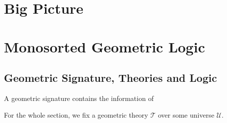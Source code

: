 %


\chapter{Big Picture}

\chapter{Monosorted Geometric Logic}
\section{Geometric Signature, Theories and Logic}

\begin{definition}
A geometric signature contains the information of 
\end{definition}


\newcommand{\thT}{\ensuremath{\mathcal{T}}}
\newcommand{\fmlInCtx}[2]{\{ #1 | #2 \}}
\newcommand{\subs}[2]{{#1}[{#1}]}
\newcommand{\Univ}{\ensuremath{\mathscr{U}}}
\newcommand{\quot}{\text{quot}}
\newcommand{\vxz}{\vec{x}+\vec{z}}
\newcommand{\vw}{\vec{w}}
\newcommand{\vx}{\vec{x}}
\newcommand{\vy}{\vec{y}}
\newcommand{\iotas}{\ensuremath{[\iota_1,\iota_2]}}
\newcommand{\xphi}{\vec{x}\mid\phi}
\newcommand{\ypsi}{\vec{y}\mid\psi}
\newcommand{\zzeta}{\vec{z}\mid\zeta}
\newcommand{\ophi}{\overline{\phi}}
\newcommand{\ozeta}{\overline{\zeta}}
\newcommand{\ox}{\overline{x}}
\newcommand{\oz}{\overline{z}}

For the whole section, we fix a geometric theory \thT{} over some universe \Univ{}.

